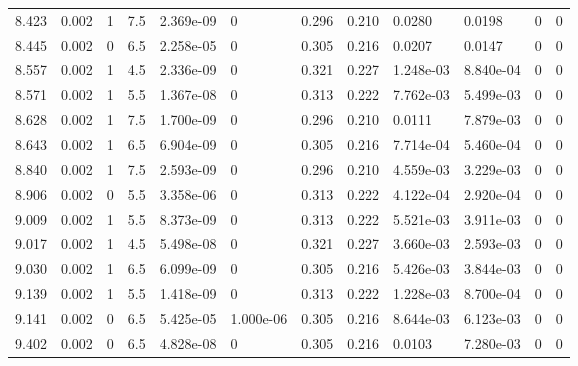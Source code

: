 \documentclass[preview]{standalone}
\begin{document}
{{{\begin{tabular}{L{1.2cm}C{1.2cm} C{0.3cm}C{0.5cm} C{1.4cm}C{1.4cm} C{1.4cm}C{1.4cm} C{1.6cm}C{1.6cm} C{1.6cm}C{1.6cm}}
  8.423  &  0.002  & 1     & 7.5 &  2.369e-09  & 0  &  0.296&   0.210& 0.0280 & 0.0198   &  0 & 0  \\ 
  8.445  &  0.002  & 0     & 6.5 &  2.258e-05  & 0  &  0.305&   0.216& 0.0207 & 0.0147   &  0 & 0  \\ 
  8.557  &  0.002  & 1     & 4.5 &  2.336e-09  & 0  &  0.321&   0.227& 1.248e-03 & 8.840e-04   &  0 & 0  \\ 
  8.571  &  0.002  & 1     & 5.5 &  1.367e-08  & 0  &  0.313&   0.222& 7.762e-03 & 5.499e-03   &  0 & 0  \\ 
  8.628  &  0.002  & 1     & 7.5 &  1.700e-09  & 0  &  0.296&   0.210& 0.0111 & 7.879e-03   &  0 & 0  \\ 
  8.643  &  0.002  & 1     & 6.5 &  6.904e-09  & 0  &  0.305&   0.216& 7.714e-04 & 5.460e-04   &  0 & 0  \\ 
  8.840  &  0.002  & 1     & 7.5 &  2.593e-09  & 0  &  0.296&   0.210& 4.559e-03 & 3.229e-03   &  0 & 0  \\ 
  8.906  &  0.002  & 0     & 5.5 &  3.358e-06  & 0  &  0.313&   0.222& 4.122e-04 & 2.920e-04   &  0 & 0  \\ 
  9.009  &  0.002  & 1     & 5.5 &  8.373e-09  & 0  &  0.313&   0.222& 5.521e-03 & 3.911e-03   &  0 & 0  \\ 
  9.017  &  0.002  & 1     & 4.5 &  5.498e-08  & 0  &  0.321&   0.227& 3.660e-03 & 2.593e-03   &  0 & 0  \\ 
  9.030  &  0.002  & 1     & 6.5 &  6.099e-09  & 0  &  0.305&   0.216& 5.426e-03 & 3.844e-03   &  0 & 0  \\ 
  9.139  &  0.002  & 1     & 5.5 &  1.418e-09  & 0  &  0.313&   0.222& 1.228e-03 & 8.700e-04   &  0 & 0  \\ 
  9.141  &  0.002  & 0     & 6.5 &  5.425e-05  & 1.000e-06  &  0.305&   0.216& 8.644e-03 & 6.123e-03   &  0 & 0  \\ 
  9.402  &  0.002  & 0     & 6.5 &  4.828e-08  & 0  &  0.305&   0.216& 0.0103 & 7.280e-03   &  0 & 0  \\ 
\hline 
\end{tabular} 

}}}
\end{document}

